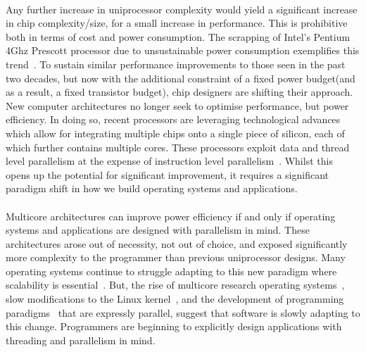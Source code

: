 \paragraph{} Any further increase in uniprocessor complexity would yield
a significant increase in chip complexity/size, for a small increase in performance.
 This is prohibitive both in terms of cost and power consumption.
 The scrapping of Intel's Pentium 4Ghz Prescott processor due to 
unsustainable power consumption exemplifies this trend~\cite{Pentium}.
To sustain similar performance improvements to those seen in the past two
decades, but now with the additional constraint of a fixed power
budget(and as a result, a fixed transistor budget), chip designers are shifting their approach. 
New computer architectures no longer seek to optimise performance, but power efficiency.
In doing so, recent processors are leveraging technological advances which allow for integrating multiple chips
onto a single piece of silicon, each of which further contains multiple cores. 
These processors exploit data and thread level parallelism at the expense of 
instruction level parallelism~\cite{Borkar:2007:TCC:1278480.1278667}. Whilst
this opens up the potential for significant improvement, it
requires a significant paradigm shift in how we build operating
systems and applications. 

\paragraph{} Multicore architectures can improve power efficiency 
if and only if operating systems and applications are designed
with parallelism in mind. These architectures arose out of necessity,
not out of choice, and exposed significantly more complexity to the 
programmer than previous uniprocessor designs. Many operating systems
continue to struggle adapting to this new paradigm where
scalability is essential~\cite{boyd2010analysis}. But, the rise of 
multicore research operating systems~\cite{fos,barrelfish,Corey},
slow modifications to the Linux kernel~\cite{dobson2003linux}, and
the development of programming paradigms~\cite{dean2004mapreduce,openmp08}
that are expressly parallel, suggest that software is slowly adapting
to this change. Programmers are beginning to explicitly design
applications with threading and parallelism in mind.

